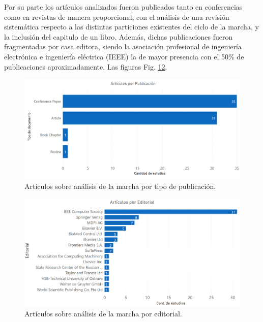 Por su parte los artículos analizados fueron publicados tanto en conferencias como en revistas de manera proporcional, con el análisis de una revisión sistemática respecto a las distintas particiones existentes del ciclo de la marcha, y la inclusión del capitulo de un libro. Además, dichas publicaciones fueron fragmentadas por casa editora, siendo la asociación profesional de ingeniería electrónica e ingeniería eléctrica (IEEE) la de mayor presencia con el 50\% de publicaciones aproximadamente. Las figuras Fig. \ref{fig:synthesis_publicationType}\ref{fig:synthesis_publicationEditorial}.

\begin{figure}[H]
\centering
\includegraphics[width=\textwidth]{TESIS/imagenes/chap03/sintesis_documentType.PNG}
 \caption{Artículos sobre análisis de la marcha por tipo de publicación.}
 \label{fig:synthesis_publicationType}
\end{figure}

\begin{figure}[H]
 \centering
 \includegraphics[width=\textwidth]{TESIS/imagenes/chap03/sintesis_editorial.PNG}
 \caption{Artículos sobre análisis de la marcha por editorial.}
 \label{fig:synthesis_publicationEditorial}
\end{figure}

